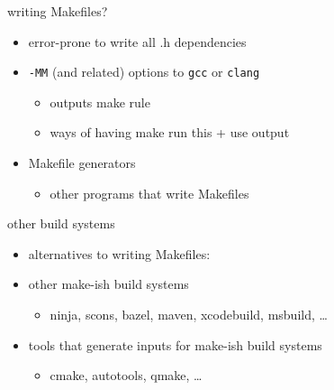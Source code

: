 \begin{frame}{writing Makefiles?}
\begin{itemize}
\item error-prone to write all .h dependencies
\vspace{.5cm}
\item \texttt{-MM} (and related) options to \texttt{gcc} or \texttt{clang}
    \begin{itemize}
    \item outputs make rule
    \item ways of having make run this + use output
    \end{itemize}
\item Makefile generators
    \begin{itemize}
    \item other programs that write Makefiles
    \end{itemize}
\end{itemize}
\end{frame}

\begin{frame}{other build systems}
\begin{itemize}
\item alternatives to writing Makefiles:
\vspace{.25cm}
\item other make-ish build systems
    \begin{itemize}
    \item ninja, scons, bazel, maven, xcodebuild, msbuild, \ldots
    \end{itemize}
\item tools that generate inputs for make-ish build systems
    \begin{itemize}
    \item cmake, autotools, qmake, \ldots
    \end{itemize}
\end{itemize}
\end{frame}
